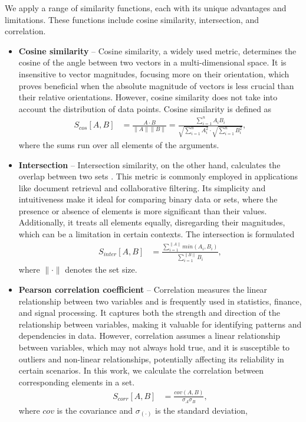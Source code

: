 We apply a range of similarity functions, each with its unique advantages and limitations. These functions include cosine similarity, intersection, and correlation.
\begin{itemize}
  \item \textbf{Cosine similarity} -- Cosine similarity, a widely used metric, determines the cosine of the angle
  between two vectors in a multi-dimensional space. It is insensitive to vector magnitudes, focusing more on their
  orientation, which proves beneficial when the absolute magnitude of vectors is less crucial than their relative
  orientations. However, cosine similarity does not take into account the distribution of data points. Cosine
  similarity is defined as
  \begin{align}
    S_{cos} [A,B] &= \frac{A\cdot B}{\|A\|\|B\|} = \frac{\sum_{i=1}^nA_iB_i}{\sqrt{\sum_{i=1}^nA_i^2} \cdot \sqrt{\sum_{i
    =1}^n B_i^2}},
  \end{align}
  where the sums run over all elements of the arguments.
  \item \textbf{Intersection} -- Intersection similarity, on the other hand, calculates the overlap between two sets
  . This metric is commonly employed in applications like document retrieval and collaborative filtering. Its
  simplicity and intuitiveness make it ideal for comparing binary data or sets, where the presence or absence of
  elements is more significant than their values. Additionally, it treats all elements equally, disregarding their
  magnitudes, which can be a limitation in certain contexts. The intersection is formulated
    \begin{align}
      S_{inter}[A,B] &= \frac{\sum_{i=1}^{\|A\|} min(A_i, B_i) }{\sum_{i=1}^{\|B\|} B_i},
    \end{align}
    where $\|\cdot\|$ denotes the set size.
  \item \textbf{Pearson correlation coefficient} -- Correlation measures the linear relationship between two
  variables and is frequently used in statistics, finance, and signal processing. It captures both the strength and
  direction of the relationship between variables, making it valuable for identifying patterns and dependencies in
  data. However, correlation assumes a linear relationship between variables, which may not always hold true, and it
  is susceptible to outliers and non-linear relationships, potentially affecting its reliability in certain scenarios. In this work, we calculate the correlation between corresponding elements in a set.
    \begin{align}
      S_{corr}[A,B] &= \frac{cov(A,B)}{\sigma_A \sigma_B},
    \end{align}
    where $cov$ is the covariance and $\sigma_{(\cdot)}$ is the standard deviation,
\end{itemize}

